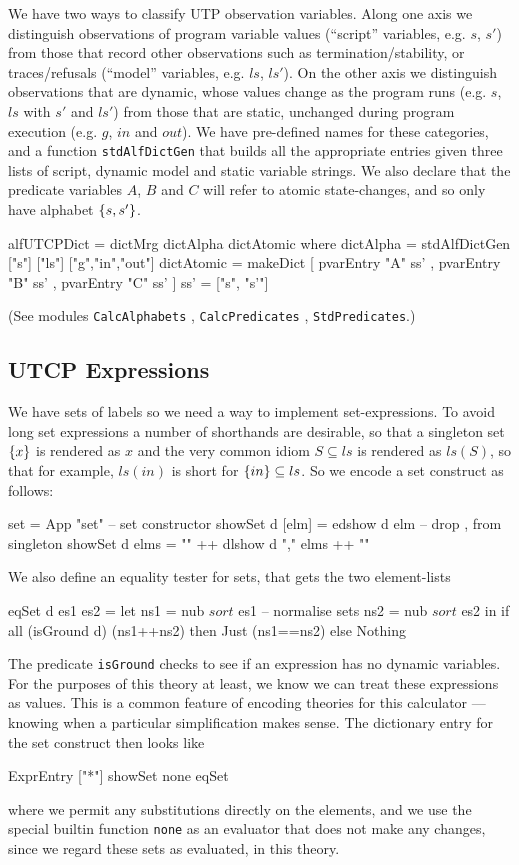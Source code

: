 We have two ways to classify UTP observation variables.
Along one axis we distinguish observations of program variable
values (``script'' variables, e.g. $s$, $s'$) from those that record other
observations such as termination/stability,
or traces/refusals (``model'' variables, e.g. $ls$, $ls'$).
On the other axis we distinguish observations
that are dynamic, whose values change as the program runs
(e.g. $s$, $ls$ with $s'$ and $ls'$)
from those that are static,
unchanged during program execution (e.g. $g$, $in$ and $out$).
We have pre-defined names for these categories,
and a function \texttt{stdAlfDictGen} that
builds all the appropriate entries
given three lists of script, dynamic model and static variable strings.
We also declare that the predicate variables $A$, $B$ and $C$
will refer to atomic state-changes,
and so only have alphabet $\{{s,s'}\}$.
\begin{code}
alfUTCPDict
 = dictMrg dictAlpha dictAtomic
 where
   dictAlpha = stdAlfDictGen ["s"] ["ls"] ["g","in","out"]
   dictAtomic = makeDict [ pvarEntry "A" ss'
                         , pvarEntry "B" ss'
                         , pvarEntry "C" ss' ]
   ss' = ["s", "s'"]
\end{code}
(See modules
\texttt{CalcAlphabets}
, \texttt{CalcPredicates}
, \texttt{StdPredicates}.)

\subsection{UTCP Expressions}

We have sets of labels
so we need a way to implement set-expressions.
To avoid long set expressions a number of shorthands are desirable,
so that a singleton set $\{{x}\}$ is rendered as $x$
and the very common idiom $S \subseteq ls$
is rendered as $ls(S)$,
so that for example, $ls(in)$ is short for $\{{in}\} \subseteq ls$.
So we encode a set construct as follows:
\begin{code}
set = App "set"                             -- set constructor
showSet d [elm] = edshow d elm      -- drop {,} from singleton
showSet d elms = "{" ++ dlshow d "," elms ++ "}"
\end{code}
We also define an equality tester for sets,
that gets the two element-lists
\begin{code}
eqSet d es1 es2
 = let ns1 = nub $ sort $ es1                -- normalise sets
       ns2 = nub $ sort $ es2
   in if all (isGround d) (ns1++ns2)
      then Just (ns1==ns2)
      else Nothing
\end{code}
The predicate \texttt{isGround} checks to see if an expression has no
dynamic variables.
For the purposes of this theory at least,
we know we can treat these expressions as values.
This is a common feature of encoding theories for this calculator%
---%
knowing when a particular simplification makes sense.
The dictionary entry for the set construct then looks like
\begin{code}
ExprEntry ["*"] showSet none eqSet
\end{code}
where we permit any substitutions directly on the elements,
and we use the special builtin function \texttt{none}
as an evaluator that does not make any changes,
since we regard these sets as evaluated, in this theory.

